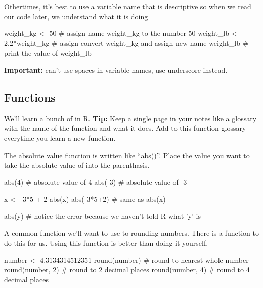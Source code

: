 Othertimes, it's best to use a variable name that is descriptive so
when we read our code later, we understand what it is doing

\begin{example}[Convert kg to lb's]
  \begin{rcode}    
    weight_kg <- 50 # assign name weight_kg to the number 50
    weight_lb <- 2.2*weight_kg # assign convert weight_kg and assign new name
    weight_lb # print the value of weight_lb
  \end{rcode}
  \textbf{Important:} can't use spaces in variable names, use underscore instead.
\end{example}
  
\subsection{Functions}
\label{sec:r_functions}

We'll learn a bunch of  in R.  \textbf{Tip:} Keep a
single page in your notes like a glossary with the name of the
function and what it does.  Add to this function glossary everytime
you learn a new function.

\begin{example}
  The absolute value function is written like ``abs()''.  Place the
  value you want to take the absolute value of into the parenthasis.
  \begin{rcode}
    abs(4) # absolute value of 4
    abs(-3) # absolute value of -3
    
    x <- -3*5 + 2
    abs(x)
    abs(-3*5+2) # same as abs(x)

    abs(y) # notice the error because we haven't told R what 'y' is
  \end{rcode}    
\end{example}

\begin{example}
  A common function we'll want to use to rounding numbers.  There is
  a function to do this for us.  Using this function is better than
  doing it yourself.
  \begin{rcode}
    number <- 4.3134314512351
    round(number) # round to nearest whole number
    round(number, 2) # round to 2 decimal places
    round(number, 4) # round to 4 decimal places
  \end{rcode}    
\end{example}

